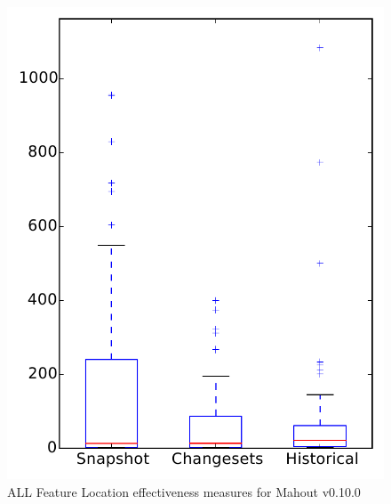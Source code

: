 
\begin{figure}
\centering
\includegraphics[height=0.4\textheight]{figures/flt/all_mahout}
\caption{ALL Feature Location effectiveness measures for Mahout v0.10.0}
\label{fig:flt:all:mahout}
\end{figure}

